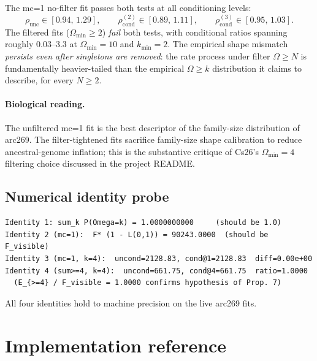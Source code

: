 \documentclass[11pt]{article}
\newcommand{\1}{\mathbf{1}}
\newcommand{\Om}{\Omega}
\theoremstyle{definition}
\begin{document}
The mc=1 no-filter fit passes both tests at all conditioning levels:
\[
\rho_{\mathrm{unc}} \in [0.94,\, 1.29], \qquad
\rho_{\mathrm{cond}}^{(2)} \in [0.89,\, 1.11], \qquad
\rho_{\mathrm{cond}}^{(3)} \in [0.95,\, 1.03].
\]
The filtered fits ($\Om_{\min} \ge 2$) \emph{fail} both tests, with
conditional ratios spanning roughly $0.03$--$3.3$ at
$\Om_{\min} = 10$ and $k_{\min} = 2$. The empirical shape mismatch
\emph{persists even after singletons are removed}: the rate process
under filter $\Om\ge N$ is fundamentally heavier-tailed than the
empirical $\Om \ge k$ distribution it claims to describe, for every
$N \ge 2$.

\paragraph{Biological reading.}
The unfiltered mc=1 fit is the best descriptor of the family-size
distribution of arc269. The filter-tightened fits sacrifice family-size
shape calibration to reduce ancestral-genome inflation; this is the
substantive critique of Cs26's $\Om_{\min}=4$ filtering choice
discussed in the project README.

\subsection{Numerical identity probe}
\label{sec:numerical-probe}

\begin{verbatim}
Identity 1: sum_k P(Omega=k) = 1.0000000000     (should be 1.0)
Identity 2 (mc=1):  F* (1 - L(0,1)) = 90243.0000  (should be F_visible)
Identity 3 (mc=1, k=4):  uncond=2128.83, cond@1=2128.83  diff=0.00e+00
Identity 4 (sum>=4, k=4):  uncond=661.75, cond@4=661.75  ratio=1.0000
  (E_{>=4} / F_visible = 1.0000 confirms hypothesis of Prop. 7)
\end{verbatim}

All four identities hold to machine precision on the live arc269
fits.

\section{Implementation reference}
\end{document}
